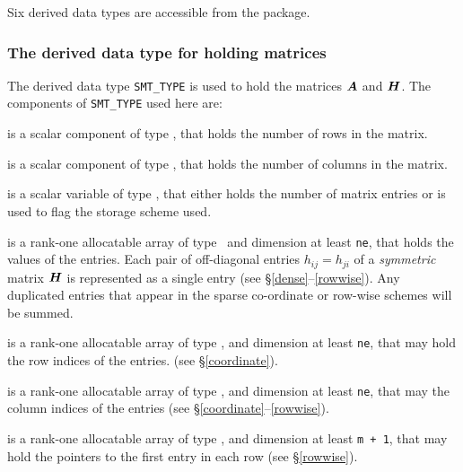 \documentclass{galahad}
\begin{document}




\galtypes

Six derived data types are accessible from the package.


\subsubsection{The derived data type for holding matrices}\label{typesmt}
The derived data type {\tt SMT\_TYPE} is used to hold the matrices ${\bm{A}}$
and ${\bm{H}}$. The components of {\tt SMT\_TYPE} used here are:

\begin{description}

 is a scalar component of type \integer,
that holds the number of rows in the matrix.

 is a scalar component of type \integer,
that holds the number of columns in the matrix.

 is a scalar variable of type \integer, that either
holds the number of matrix entries or is used to flag the storage scheme
used.

 is a rank-one allocatable array of type \realdp\,
and dimension at least {\tt ne}, that holds the values of the entries.
Each pair of off-diagonal entries $h_{ij} = h_{ji}$ of a {\em symmetric}
matrix ${\bm{H}}$ is represented as a single entry
(see \S\ref{dense}--\ref{rowwise}).
Any duplicated entries that appear in the sparse
co-ordinate or row-wise schemes will be summed.

 is a rank-one allocatable array of type \integer,
and dimension at least {\tt ne}, that may hold the row indices of the entries.
(see \S\ref{coordinate}).

 is a rank-one allocatable array of type \integer,
and dimension at least {\tt ne}, that may the column indices of the entries
(see \S\ref{coordinate}--\ref{rowwise}).

 is a rank-one allocatable array of type \integer,
and dimension at least {\tt m + 1}, that may hold the pointers to
the first entry in each row (see \S\ref{rowwise}).

\end{description}
\end{document}
